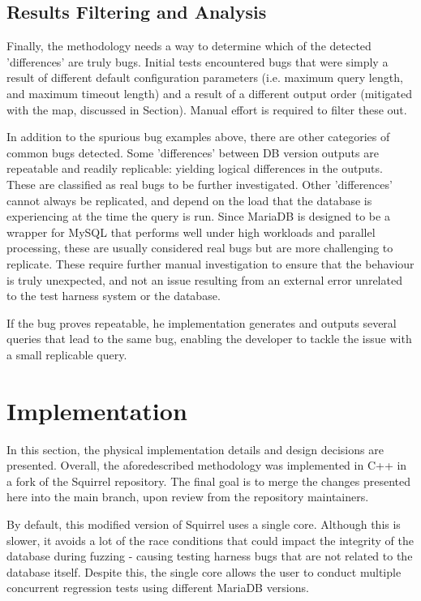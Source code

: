 \documentclass[sigconf]{acmart}
\begin{document}
\subsection{Results Filtering and Analysis}
\label{lab:results_filtering}
Finally, the methodology needs a way to determine which of the detected 'differences' are truly bugs. Initial tests encountered bugs that were simply a result of different default configuration parameters (i.e. maximum query length, and maximum timeout length) and a result of a different output order (mitigated with the map, discussed in Section). Manual effort is required to filter these out.

In addition to the spurious bug examples above, there are other categories of common bugs detected. Some 'differences' between DB version outputs are repeatable and readily replicable: yielding logical differences in the outputs. These are classified as real bugs to be further investigated. Other 'differences' cannot always be replicated, and depend on the load that the database is experiencing at the time the query is run. Since MariaDB is designed to be a wrapper for MySQL that performs well under high workloads and parallel processing, these are usually considered real bugs but are more challenging to replicate. These require further manual investigation to ensure that the behaviour is truly unexpected, and not an issue resulting from an external error unrelated to the test harness system or the database.

If the bug proves repeatable, he implementation generates and outputs several queries that lead to the same bug, enabling the developer to tackle the issue with a small replicable query.





\section{Implementation}
\label{lab:implementation}
In this section, the physical implementation details and design decisions are presented. Overall, the aforedescribed methodology was implemented in C++ in a fork of the Squirrel repository. The final goal is to merge the changes presented here into the main branch, upon review from the repository maintainers. 

By default, this modified version of Squirrel uses a single core. Although this is slower, it avoids a lot of the race conditions that could impact the integrity of the database during fuzzing - causing testing harness bugs that are not related to the database itself. Despite this, the single core allows the user to conduct multiple concurrent regression tests using different MariaDB versions.
\end{document}
